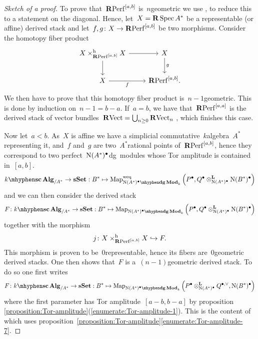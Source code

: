 \begin{refsection}
\begin{theorem}
\begin{proof}[Sketch of a proof]
    To prove that~$\mathbf{R}\mathrm{Perf}^{[a,b]}$ is~$n$\dash geometric we use \cite[lemma 2.18]{toen-vaquie}, to reduce this to a statement on the diagonal. Hence, let~$X=\mathbf{R}\operatorname{Spec} A^*$ be a representable (or affine) derived stack and let~$f,g\colon X\to\mathbf{R}\mathrm{Perf}^{[a,b]}$ be two morphisms. Consider the homotopy fiber product
    \begin{equation}
      \begin{tikzcd}
        X\times_{\RPerf^{[a,b]}}^{\mathrm{h}}X \arrow{r} \arrow{d} & X \arrow{d}{g} \\
        X \arrow[swap]{r}{f} & \RPerf^{[a,b]}.
      \end{tikzcd}
    \end{equation}
    We then have to prove that this homotopy fiber product is~$n-1$\dash geometric. This is done by induction on~$n-1=b-a$. If~$a=b$, we have that~$\mathbf{R}\mathrm{Perf}^{[a,a]}$ is the derived stack of vector bundles~$\mathbf{R}\mathrm{Vect}=\bigcup_{n\geq 0}\mathbf{R}\mathrm{Vect}_n$ \cite[corollary 1.3.7.4]{hagII}, which finishes this case.

    Now let~$a<b$. As~$X$ is affine we have a simplicial commutative~$k$\dash algebra~$A^*$ representing it, and~$f$ and~$g$ are two~$A^*$\dash rational points of~$\mathbf{R}\mathrm{Perf}^{[a,b]}$, hence they correspond to two perfect~$\operatorname{N}(A^*)^\bullet$\dash dg~modules whose Tor amplitude is contained in~$[a,b]$.  
    \begin{equation}
      \scAlg{k}_{/A^*}\to\sSet:B^*\mapsto\Map_{\dgMod{\nerve(A^*)^\bullet}_k}^{\mathrm{weq}}\left( P^\bullet,Q^\bullet\otimes_{\nerve(A^*)^\bullet}^{\mathbf{L}}\nerve(B^*)^\bullet \right)
    \end{equation}
    and we can then consider the derived stack
    \begin{equation}
      F\colon\scAlg{k}_{/A^*}\to\sSet:B^*\mapsto\Map_{\dgMod{\nerve(A^*)^\bullet}_k}\left( P^\bullet,Q^\bullet\otimes_{\nerve(A^*)^\bullet}^{\mathbf{L}}\nerve(B^*)^\bullet \right)
    \end{equation}
    together with the morphism
    \begin{equation}
      j\colon X\times_{\mathbf{R}\mathrm{Perf}^{[a,b]}}^{\mathrm{h}}X\hookrightarrow F.
    \end{equation}
    This morphism is proven to be~$0$\dash representable, hence its fibers are~$0$\dash geometric derived stacks. One then shows that~$F$ is a~$(n-1)$\dash geometric derived stack. To do so one first writes
    \begin{equation}
      F\colon\scAlg{k}_{/A^*}\to\sSet:B^*\mapsto\Map_{\dgMod{\nerve(A^*)^\bullet}_k}\left( P^\bullet\otimes_{\nerve(A^*)^\bullet}^{\mathbf{L}}Q^{\bullet,\vee},\nerve(B^*)^\bullet \right)
    \end{equation}
    where the first parameter has Tor amplitude~$[a-b,b-a]$ by proposition \ref{proposition:Tor-amplitude}(\ref{enumerate:Tor-amplitude-1}). This is the content of \cite[sublemma 3.9]{toen-vaquie} which uses proposition~\ref{proposition:Tor-amplitude}\ref{enumerate:Tor-amplitude-7}.


\end{proof}
\end{theorem}
\end{refsection}
